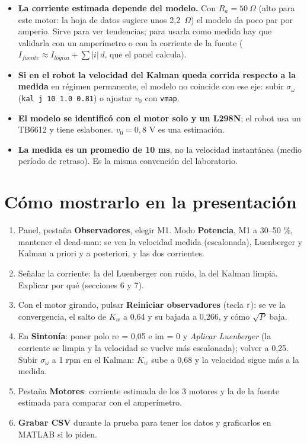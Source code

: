 \documentclass[11pt]{article}
\newcommand{\cod}[1]{\texttt{#1}}
\begin{document}
\begin{alerta}
\begin{itemize}
  \item \textbf{La corriente estimada depende del modelo.} Con $R_a=50~\Omega$ (alto para este motor: la hoja de datos sugiere unos 2,2~$\Omega$) el modelo da poco par por amperio. Sirve para ver tendencias; para usarla como medida hay que validarla con un amperímetro o con la corriente de la fuente ($I_{fuente}\approx I_{lógica}+\sum|i|\,d$, que el panel calcula).
  \item \textbf{Si en el robot la velocidad del Kalman queda corrida respecto a la medida} en régimen permanente, el modelo no coincide con ese eje: subir $\sigma_\omega$ (\cod{kal j 10 1.0 0.81}) o ajustar $v_0$ con \cod{vmap}.
  \item \textbf{El modelo se identificó con el motor solo y un L298N}; el robot usa un TB6612 y tiene eslabones. $v_0=0{,}8$ V es una estimación.
  \item \textbf{La medida es un promedio de 10 ms}, no la velocidad instantánea (medio período de retraso). Es la misma convención del laboratorio.
\end{itemize}
\end{alerta}

\section{Cómo mostrarlo en la presentación}

\begin{enumerate}
  \item Panel, pestaña \textbf{Observadores}, elegir M1. Modo \textbf{Potencia}, M1 a 30--50 \%, mantener el dead-man: se ven la velocidad medida (escalonada), Luenberger y Kalman a priori y a posteriori, y las dos corrientes.
  \item Señalar la corriente: la del Luenberger con ruido, la del Kalman limpia. Explicar por qué (secciones 6 y 7).
  \item Con el motor girando, pulsar \textbf{Reiniciar observadores} (tecla \cod{r}): se ve la convergencia, el salto de $K_w$ a 0,64 y su bajada a 0,266, y cómo $\sqrt P$ baja.
  \item En \textbf{Sintonía}: poner polo re = 0,05 e im = 0 y \emph{Aplicar Luenberger} (la corriente se limpia y la velocidad se vuelve más escalonada); volver a 0,25. Subir $\sigma_\omega$ a 1 rpm en el Kalman: $K_w$ sube a 0,68 y la velocidad sigue más a la medida.
  \item Pestaña \textbf{Motores}: corriente estimada de los 3 motores y la de la fuente estimada para comparar con el amperímetro.
  \item \textbf{Grabar CSV} durante la prueba para tener los datos y graficarlos en MATLAB si lo piden.
\end{enumerate}
\end{document}
